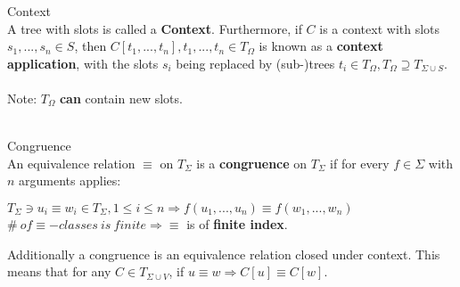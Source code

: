 \documentclass{llncs}
\begin{document}
\begin{definition}{Context} \cite{tata-nfta}\cite{martens-uni-dortmund-lecture01}\\
	A tree with slots is called a \textbf{Context}. Furthermore, if \(C\) is a context with slots \(s_1, ..., s_n \in S\), then \(C[t_1, ..., t_n], t_1, ..., t_n \in T_\Omega\) is known as a \textbf{context application}, with the slots \(s_i\) being replaced by (sub-)trees \(t_i \in T_\Omega, T_\Omega \supseteq T_{\Sigma \cup S}\).
	\\\\
	Note: \(T_\Omega\) \textbf{can} contain new slots.
	\\\\
\end{definition}
\begin{minipage}{0.5\textwidth}
	\begin{center}
	\end{center}
\end{minipage}
\begin{minipage}{0.5\textwidth}
	\begin{center}
	\end{center}
\end{minipage}

\begin{definition}{Congruence} \cite{tata-nfta} \\
	An equivalence relation \(\equiv\)  on \(T_\Sigma\) is a \textbf{congruence} on \(T_\Sigma\) if for every \(f \in \Sigma\) with \(n\) arguments applies:
	\begin{center}
		\(T_\Sigma \ni u_i \equiv w_i \in T_\Sigma, 1 \leq i \leq n \Rightarrow f(u_1, ..., u_n) \equiv f(w_1, ..., w_n)\)\\
		\(\#~of \equiv-classes~is~finite \Rightarrow \equiv\) is of \textbf{finite index}.
	\end{center}
	Additionally a congruence is an equivalence relation closed under context. This means that for any \(C \in T_{\Sigma \cup V}\), if \(u \equiv w \Rightarrow C[u] \equiv C[w]\).
\end{definition}
\end{document}
